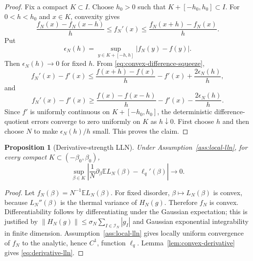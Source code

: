 \documentclass[11pt]{article}
\newtheorem{proposition}[theorem]{Proposition}
\newcommand{\E}{\mathbb{E}}
\newcommand{\calI}{\mathcal{I}}
\newcommand{\norm}[1]{\left\lVert #1\right\rVert}
\begin{document}
\begin{proof}
  Fix a compact $K\subset I$.  Choose $h_0>0$ such that
  $K+[-h_0,h_0]\subset I$.  For $0<h<h_0$ and $x\in K$, convexity gives
  \begin{equation}\label{eq:convex-difference-squeeze}
    \frac{f_N(x)-f_N(x-h)}{h}
    \leq f_N'(x)
    \leq
    \frac{f_N(x+h)-f_N(x)}{h}.
  \end{equation}
  Put
  \begin{equation}\label{eq:epsilon-nh}
    \epsilon_N(h)=\sup_{y\in K+[-h,h]}|f_N(y)-f(y)|.
  \end{equation}
  Then $\epsilon_N(h)\to0$ for fixed $h$.  From
  \eqref{eq:convex-difference-squeeze},
  \begin{equation}\label{eq:upper-convex-derivative}
    f_N'(x)-f'(x)
    \leq
    \frac{f(x+h)-f(x)}{h}-f'(x)
    +\frac{2\epsilon_N(h)}{h},
  \end{equation}
  and
  \begin{equation}\label{eq:lower-convex-derivative}
    f_N'(x)-f'(x)
    \geq
    \frac{f(x)-f(x-h)}{h}-f'(x)
    -\frac{2\epsilon_N(h)}{h}.
  \end{equation}
  Since $f'$ is uniformly continuous on $K+[-h_0,h_0]$, the deterministic
  difference-quotient errors converge to zero uniformly on $K$ as $h\downarrow0$.
  First choose $h$ and then choose $N$ to make $\epsilon_N(h)/h$ small.  This
  proves the claim.
\end{proof}

\begin{proposition}[Derivative-strength LLN]
  \label{prop:derivative-lln-from-lln}
  Under Assumption~\ref{ass:local-lln}, for every compact
  $K\subset(-\beta_0,\beta_0)$,
  \begin{equation}\label{eq:derivative-lln}
    \sup_{\beta\in K}
    \left|
      \frac1N\partial_\beta\E L_N(\beta)-\ell_q'(\beta)
    \right|
    \to0.
  \end{equation}
\end{proposition}

\begin{proof}
  Let $f_N(\beta)=N^{-1}\E L_N(\beta)$.  For fixed disorder,
  $\beta\mapsto L_N(\beta)$ is convex, because $L_N''(\beta)$ is the thermal
  variance of $H_N(g)$.  Therefore $f_N$ is convex.  Differentiability follows
  by differentiating under the Gaussian expectation; this is justified by
  $\norm{H_N(g)}\leq \sigma_N\sum_{I\in\calI_N}|g_I|$ and Gaussian
  exponential integrability in finite dimension.  Assumption~\ref{ass:local-lln} gives
  locally uniform convergence of $f_N$ to the analytic, hence $C^1$, function
  $\ell_q$.  Lemma~\ref{lem:convex-derivative} gives
  \eqref{eq:derivative-lln}.
\end{proof}
\end{document}
